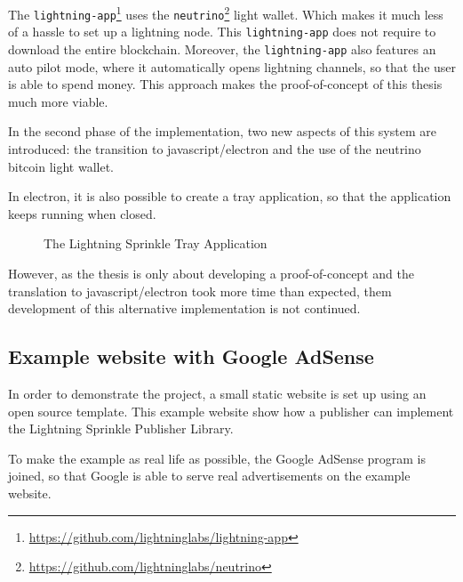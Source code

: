 The \texttt{lightning-app}\footnote{\url{https://github.com/lightninglabs/lightning-app}} uses the \texttt{neutrino}\footnote{\url{https://github.com/lightninglabs/neutrino}} light wallet. Which makes it much less of a hassle to set up a lightning node. This \texttt{lightning-app} does not require to download the entire blockchain. Moreover, the \texttt{lightning-app} also features an auto pilot mode, where it automatically opens lightning channels, so that the user is able to spend money. This approach makes the proof-of-concept of this thesis much more viable. 

In the second phase of the implementation, two new aspects of this system are introduced: the transition to javascript/electron and the use of the neutrino bitcoin light wallet.

In electron, it is also possible to create a tray application, so that the application keeps running when closed. 


\begin{figure}[h!]
  \setlength{\fboxsep}{0pt}%
  \center
  \caption{The Lightning Sprinkle Tray Application}
\end{figure}

However, as the thesis is only about developing a proof-of-concept and the translation to javascript/electron took more time than expected, them development of this alternative implementation is not continued.

\subsection{Example website with Google AdSense}
In order to demonstrate the project, a small static website is set up using an open source template. This example website show how a publisher can implement the Lightning Sprinkle Publisher Library. 

To make the example as real life as possible, the Google AdSense program is joined, so that Google is able to serve real advertisements on the example website. 

